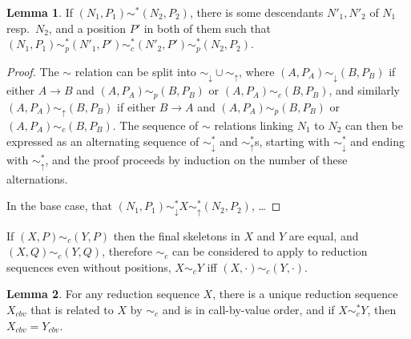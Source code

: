 \documentclass{article}
\theoremstyle{definition}
\theoremstyle{lemma}
\newtheorem{lemma}{Lemma}
\theoremstyle{remark}
\begin{document}
\begin{lemma} \label{downAcrossUp}
If $(N_1,P_1) \sim^* (N_2,P_2)$, there is some descendants $N'_1, N'_2$ of $N_1$ resp.~$N_2$, and a position $P'$ in both of them such that $(N_1,P_1) \sim_p^* (N'_1, P') \sim_c^* (N'_2, P') \sim_p^* (N_2, P_2)$.
\end{lemma}
\begin{proof}
The $\sim$ relation can be split into $\sim_\downarrow \cup \sim_\uparrow$, where $(A,P_A) \sim_\downarrow (B,P_B)$ if either $A \to B$ and $(A,P_A) \sim_p (B,P_B)$ or $(A,P_A) \sim_c (B,P_B)$, and similarly $(A,P_A) \sim_\uparrow (B,P_B)$ if either $B \to A$ and $(A,P_A) \sim_p (B,P_B)$ or $(A,P_A) \sim_c (B,P_B)$. The sequence of $\sim$ relations linking $N_1$ to $N_2$ can then be expressed as an alternating sequence of $\sim_\downarrow^*$ and $\sim_\uparrow^*$s, starting with $\sim_\downarrow^*$ and ending with $\sim_\uparrow^*$, and the proof proceeds by induction on the number of these alternations.

In the base case, that $(N_1,P_1) \sim_\downarrow^* X \sim_\uparrow^* (N_2,P_2)$, \dots

\end{proof}


If $(X,P) \sim_c (Y,P)$ then the final skeletons in $X$ and $Y$ are equal, and $(X,Q) \sim_c (Y,Q)$, therefore $\sim_c$ can be considered to apply to reduction sequences even without positions, $X \sim_c Y$ iff $(X,\cdot) \sim_c (Y,\cdot)$.

\begin{lemma} \label{canonicalCousins}
For any reduction sequence $X$, there is a unique reduction sequence $X_{cbv}$ that is related to $X$ by $\sim_c$ and is in call-by-value order, and if $X \sim_c^* Y$, then $X_{cbv} = Y_{cbv}$.
\end{lemma}

\end{document}
